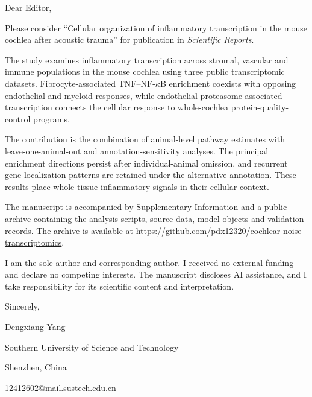
\pagestyle{empty}
\setlength{\parindent}{0pt}
\setlength{\parskip}{10pt}

Dear Editor,

Please consider ``Cellular organization of inflammatory transcription in the mouse cochlea after acoustic trauma'' for publication in \textit{Scientific Reports}.

The study examines inflammatory transcription across stromal, vascular and immune populations in the mouse cochlea using three public transcriptomic datasets. Fibrocyte-associated TNF--NF-\(\kappa\)B enrichment coexists with opposing endothelial and myeloid responses, while endothelial proteasome-associated transcription connects the cellular response to whole-cochlea protein-quality-control programs.

The contribution is the combination of animal-level pathway estimates with leave-one-animal-out and annotation-sensitivity analyses. The principal enrichment directions persist after individual-animal omission, and recurrent gene-localization patterns are retained under the alternative annotation. These results place whole-tissue inflammatory signals in their cellular context.

The manuscript is accompanied by Supplementary Information and a public archive containing the analysis scripts, source data, model objects and validation records. The archive is available at \url{https://github.com/pdx12320/cochlear-noise-transcriptomics}.

I am the sole author and corresponding author. I received no external funding and declare no competing interests. The manuscript discloses AI assistance, and I take responsibility for its scientific content and interpretation.

Sincerely,\par
Dengxiang Yang\par
Southern University of Science and Technology\par
Shenzhen, China\par
\href{mailto:12412602@mail.sustech.edu.cn}{12412602@mail.sustech.edu.cn}


